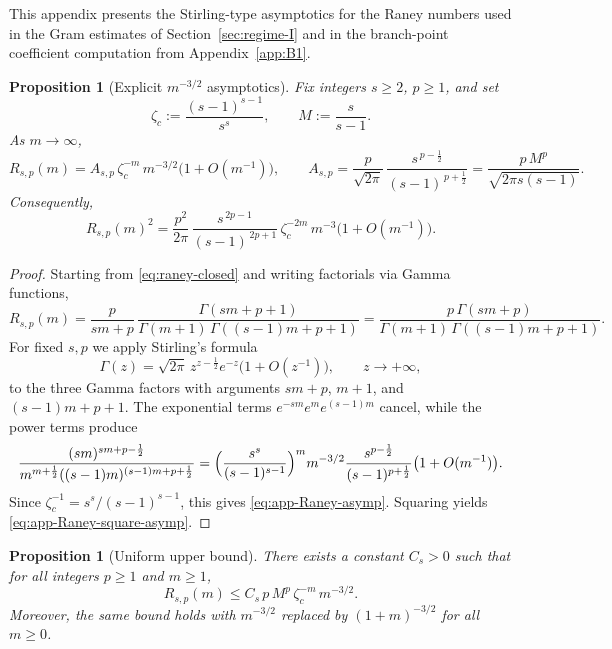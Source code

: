 \documentclass[11pt]{amsart}
\numberwithin{equation}{section}
\theoremstyle{plain}
\newtheorem{proposition}[theorem]{Proposition}
\theoremstyle{definition}
\theoremstyle{remark}
\begin{document}
This appendix presents the Stirling-type asymptotics for the Raney numbers used
in the Gram estimates of Section~\ref{sec:regime-I} and in the branch-point
coefficient computation from Appendix~\ref{app:B1}.

\begin{proposition}[Explicit $m^{-3/2}$ asymptotics]\label{prop:raney-asymp}
	Fix integers $s\ge2$, $p\ge1$, and set
	\[
		\zeta_c:=\frac{(s-1)^{s-1}}{s^s},\qquad M:=\frac{s}{s-1}.
	\]
	As $m\to\infty$,
	\begin{equation}\label{eq:app-Raney-asymp}
		R_{s,p}(m)
		=
		A_{s,p}\,\zeta_c^{-m}\,m^{-3/2}\bigl(1+O(m^{-1})\bigr),
		\qquad
		A_{s,p}
		=
		\frac{p}{\sqrt{2\pi}}\,
		\frac{s^{\,p-\frac12}}{(s-1)^{\,p+\frac12}}
		=
		\frac{p\,M^{p}}{\sqrt{2\pi s(s-1)}}.
	\end{equation}
	Consequently,
	\begin{equation}\label{eq:app-Raney-square-asymp}
		R_{s,p}(m)^2
		=
		\frac{p^{2}}{2\pi}\,
		\frac{s^{\,2p-1}}{(s-1)^{\,2p+1}}\,
		\zeta_c^{-2m}\,m^{-3}\bigl(1+O(m^{-1})\bigr).
	\end{equation}
\end{proposition}

\begin{proof}
	Starting from \eqref{eq:raney-closed} and writing factorials via Gamma functions,
	\[
		R_{s,p}(m)
		=
		\frac{p}{sm+p}\,
		\frac{\Gamma(sm+p+1)}{\Gamma(m+1)\,\Gamma((s-1)m+p+1)}
		=
		\frac{p\,\Gamma(sm+p)}{\Gamma(m+1)\,\Gamma((s-1)m+p+1)}.
	\]
	For fixed \(s,p\) we apply Stirling's formula
	\[
		\Gamma(z)=\sqrt{2\pi}\,z^{z-\frac12}e^{-z}\bigl(1+O(z^{-1})\bigr),
		\qquad z\to+\infty,
	\]
	to the three Gamma factors with arguments \(sm+p\), \(m+1\), and
	\((s-1)m+p+1\).  The exponential terms \(e^{-sm}e^{m}e^{(s-1)m}\) cancel,
	while the power terms produce
	\[
		\frac{(sm)^{sm+p-\frac12}}{m^{m+\frac12}((s-1)m)^{(s-1)m+p+\frac12}}
		=
		\Bigl(\frac{s^s}{(s-1)^{s-1}}\Bigr)^m
		m^{-3/2}\frac{s^{p-\frac12}}{(s-1)^{p+\frac12}}
		\bigl(1+O(m^{-1})\bigr).
	\]
	Since \(\zeta_c^{-1}=s^s/(s-1)^{s-1}\), this gives
	\eqref{eq:app-Raney-asymp}. Squaring yields
	\eqref{eq:app-Raney-square-asymp}.
\end{proof}

\begin{proposition}[Uniform upper bound]\label{prop:raney-uniform}
	There exists a constant $C_s>0$ such that for all integers $p\ge1$ and $m\ge1$,
	\begin{equation}\label{eq:raney-uniform}
		R_{s,p}(m)\le C_s\,p\,M^{p}\,\zeta_c^{-m}\,m^{-3/2}.
	\end{equation}
	Moreover, the same bound holds with $m^{-3/2}$ replaced by $(1+m)^{-3/2}$ for all $m\ge0$.
\end{proposition}
\end{document}
